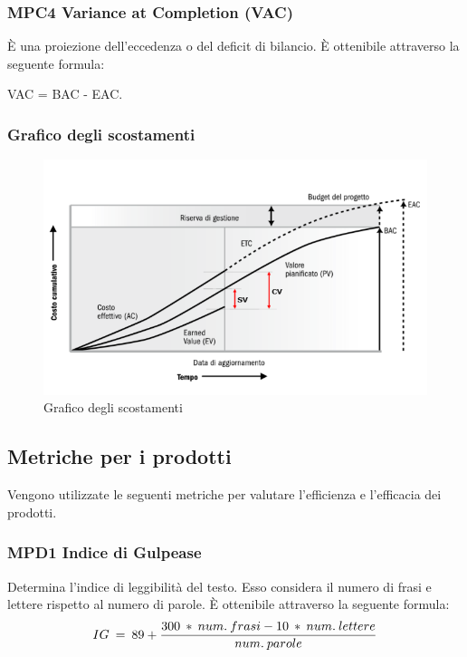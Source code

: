     \subsubsection{MPC4 Variance at Completion (VAC)}
    È una proiezione dell'eccedenza o del deficit di bilancio. È ottenibile attraverso la seguente formula:
      \begin{center}VAC = BAC - EAC.\end{center}
  
    \subsubsection{Grafico degli scostamenti}
    \begin{figure}[H]
      \centering
    \includegraphics[width=\textwidth,height=\textheight,keepaspectratio]{immagini/graficoPJ.png}
        \caption{Grafico degli scostamenti}
    \end{figure}

  \subsection{Metriche per i prodotti}
  Vengono utilizzate le seguenti metriche per valutare l'efficienza e l'efficacia dei prodotti.
    \subsubsection{MPD1 Indice di Gulpease}
    Determina l'indice di leggibilità del testo. Esso considera il numero di frasi e lettere rispetto al numero di parole. È ottenibile attraverso la seguente formula:
      \begin{displaymath}{IG \: = \: 89 + {300 \: * \: num. \: frasi - 10 \: * \: num. \: lettere \over num. \: parole}}\end{displaymath}
  
